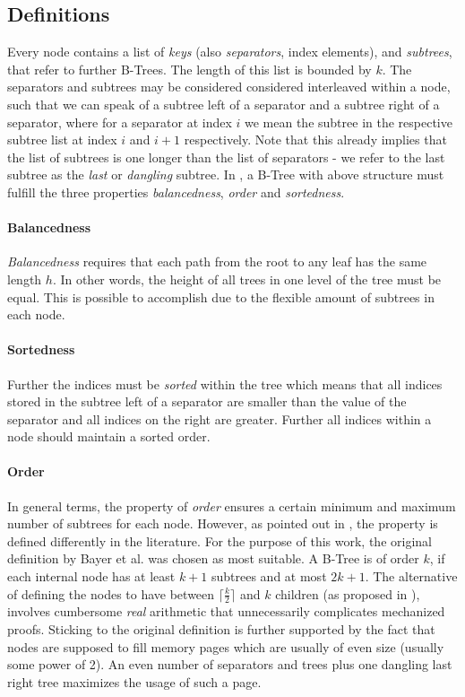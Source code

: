 \subsection{Definitions}
\label{sec:data_structure_defs}

Every node contains a list of \textit{keys} (also \textit{separators}, index elements), and \textit{subtrees},
that refer to further B-Trees.
The length of this list is bounded by $k$.
The separators and subtrees may be considered considered interleaved within a node,
such that we can speak of a subtree left of a separator and a subtree right of a separator,
where for a separator at index $i$ we mean the subtree in the respective
subtree list at index $i$ and $i+1$ respectively.
Note that this already implies that the list of subtrees is one
longer than the list of separators - we refer to the last subtree
as the \textit{last} or \textit{dangling} subtree.
In \parencite{DBLP:journals/acta/BayerM72},
a B-Tree with above structure must fulfill the three properties
\textit{balancedness}, \textit{order} and \textit{sortedness}.

\paragraph{Balancedness} \textit{Balancedness} requires
that each path from the root to any leaf has the same length $h$.
In other words, the height of all trees in one level of the tree must be equal.
This is possible to accomplish due to the flexible amount of subtrees
in each node.

\paragraph{Sortedness} Further the indices must be \textit{sorted} within the tree which means that all indices stored
in the subtree left of a separator are smaller than the value of the separator
and all indices on the right are greater.
Further all indices within a node should maintain a sorted order.

\paragraph{Order} In general terms, the property of \textit{order} ensures a certain minimum and maximum
number of subtrees for each node.
However, as pointed out in \parencite{DBLP:books/daglib/0095349_mod},
the property is defined differently in the literature.
For the purpose of this work, the original definition by Bayer et al. was chosen as most suitable.
A B-Tree is of order $k$, if each internal node has at least $k+1$
subtrees and at most $2k+1$.
The alternative of defining the nodes to have between $\lceil \frac{k}{2} \rceil$
and $k$ children (as proposed in \parencite{DBLP:books/lib/Knuth98a}),
involves cumbersome \textit{real} arithmetic that unnecessarily complicates
mechanized proofs.
Sticking to the original definition is further supported by the fact that nodes are supposed
to fill memory pages which are usually of even size (usually some power of 2).
An even number of separators and trees plus one dangling last right tree maximizes
the usage of such a page.

